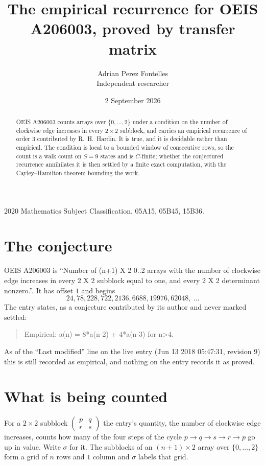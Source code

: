 \documentclass[11pt,a4paper]{article}
\title{The empirical recurrence for OEIS A206003, proved by transfer matrix}
\author{Adrian Perez Fontelles\\ \small Independent researcher}
\date{2 September 2026}
\theoremstyle{plain}
\theoremstyle{definition}
\begin{document}
\maketitle

\begin{abstract}
OEIS A206003 counts arrays over $\{0,\dots,2\}$ under a condition on the number of clockwise edge increases
in every $2\times2$ subblock, and carries an empirical recurrence of order $3$ contributed by
R.~H.~Hardin. It is true, and it is decidable rather than empirical. The condition is local to
a bounded window of consecutive rows, so the count is a walk count on $S=9$ states and is
$C$-finite; whether the conjectured recurrence annihilates it is then settled by a finite exact
computation, with the Cayley--Hamilton theorem bounding the work.
\end{abstract}

\noindent\small 2020 Mathematics Subject Classification. 05A15, 05B45, 15B36.\normalsize

\section{The conjecture}

OEIS A206003 is ``Number of (n+1) X 2 0..2 arrays with the number of clockwise edge increases in every 2 X 2 subblock equal to one, and every 2 X 2 determinant nonzero.''. It has offset $1$ and begins
\[
24, 78, 228, 722, 2136, 6688, 19976, 62048,\ \dots
\]
The entry states, as a conjecture contributed by its author and never marked settled:
\begin{quote}
Empirical: a(n) = 8*a(n-2) + 4*a(n-3) for n>4.
\end{quote}
As of the ``Last modified'' line on the live entry (Jun 13 2018 05:47:31, revision 9) this is still
recorded as empirical, and nothing on the entry records it as proved.

\section{What is being counted}

For a $2\times2$ subblock $\begin{pmatrix}p&q\\r&s\end{pmatrix}$ the
entry's quantity, the number of clockwise edge increases, counts how many of the four steps of the cycle $p\to q\to s\to r\to p$ go up in value. Write $\sigma$ for it. The subblocks of an
$(n+1)\times2$ array over $\{0,\dots,2\}$ form a grid of $n$ rows and $1$
column and $\sigma$ labels that grid.
\end{document}
